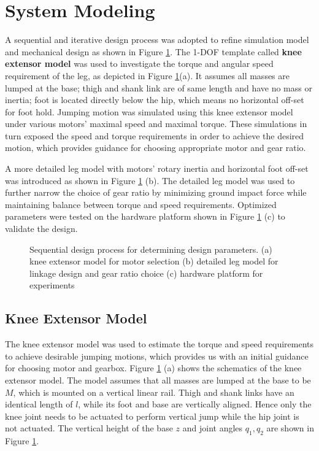 \section{\textbf{System Modeling}}
\label{sec:systemModel}

A sequential and iterative design process was adopted to refine simulation model and mechanical design as shown in Figure \ref{fig:systemOverview}. The 1-DOF template \cite{Full1999} called \textbf{knee extensor model} was used to investigate the torque and angular speed requirement of the leg, as depicted in Figure \ref{fig:systemOverview}(a). It assumes all masses are lumped at the base; thigh and shank link are of same length and have no mass or inertia; foot is located directly below the hip, which means no horizontal off-set for foot hold. Jumping motion was simulated using this knee extensor model under various motors' maximal speed and maximal torque. These simulations in turn exposed the speed and torque requirements in order to achieve the desired motion, which provides guidance for choosing appropriate motor and gear ratio.

A more detailed leg model with motors' rotary inertia and horizontal foot off-set was introduced as shown in Figure \ref{fig:systemOverview} (b). The detailed leg model was used to further narrow the choice of gear ratio by minimizing ground impact force while maintaining balance between torque and speed requirements. Optimized parameters were tested on the hardware platform shown in Figure \ref{fig:systemOverview} (c) to validate the design.

\begin{figure}
	\centering
	\caption{Sequential design process for determining design parameters. (a) knee extensor model for motor selection (b) detailed leg model for linkage design and gear ratio choice (c) hardware platform for experiments}
	\label{fig:systemOverview}
\end{figure}

\subsection{Knee Extensor Model}
\label{sec:kneeExtensorModel}

The knee extensor model was used to estimate the torque and speed requirements to achieve desirable jumping motions, which provides us with an initial guidance for choosing motor and gearbox. Figure \ref{fig:systemOverview} (a) shows the schematics of the knee extensor model. The model assumes that all masses are lumped at the base to be $M$, which is mounted on a vertical linear rail. Thigh and shank links have an identical length of $l$, while its foot and base are vertically aligned. Hence only the knee joint needs to be actuated to perform vertical jump while the hip joint is not actuated. The vertical height of the base $z$ and joint angles $q_1, q_2$ are shown in Figure \ref{fig:systemOverview}.

